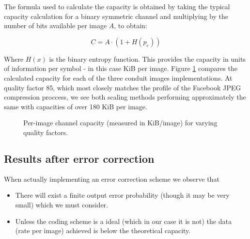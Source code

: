 The formula used to calculate the capacity is obtained by taking the typical capacity calculation for a binary symmetric channel and multiplying by the number of bits available per image $A$, to obtain:

\begin{equation}
    C = A \cdot (1 + H(p_e))
\end{equation}

Where $H(x)$ is the binary entropy function. This provides the capacity in units of information per symbol - in this case KiB per image. Figure \ref{graph:capacity} compares the calculated capacity for each of the three conduit images implementations. At quality factor 85, which most closely matches the profile of the Facebook JPEG compression proccess, we see both scaling methods performing approximately the same with capacities of over 180 KiB per image.

\begin{figure}[tbp]
  \begin{center}
    \caption{Per-image channel capacity (measured in KiB/image) for varying quality factors.}
    \label{graph:capacity}
  \end{center}
\end{figure}

\subsection{Results after error correction}

When actually implementing an error correction scheme we observe that
\begin{itemize}
    \item There will exist a finite output error probability (though it may be very small) which we must consider.
    \item Unless the coding scheme is a ideal (which in our case it is not) the data (rate per image) achieved is below the theoretical capacity.
\end{itemize}


